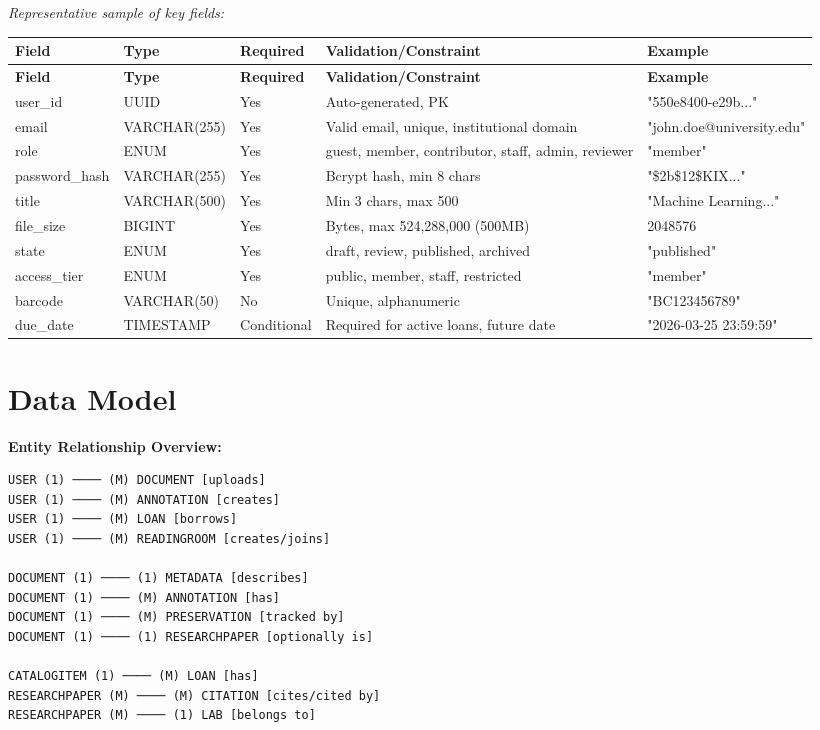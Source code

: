 \documentclass[12pt,a4paper]{report}
\begin{document}
\textit{Representative sample of key fields:}

\begin{longtable}{|p{2.5cm}|p{2cm}|p{1.5cm}|p{4cm}|p{3.5cm}|}
\hline
\textbf{Field} & \textbf{Type} & \textbf{Required} & \textbf{Validation/Constraint} & \textbf{Example} \\ \hline
\endfirsthead
\hline
\textbf{Field} & \textbf{Type} & \textbf{Required} & \textbf{Validation/Constraint} & \textbf{Example} \\ \hline
\endhead
user\_id & UUID & Yes & Auto-generated, PK & "550e8400-e29b..." \\ \hline
email & VARCHAR(255) & Yes & Valid email, unique, institutional domain & "john.doe@university.edu" \\ \hline
role & ENUM & Yes & guest, member, contributor, staff, admin, reviewer & "member" \\ \hline
password\_hash & VARCHAR(255) & Yes & Bcrypt hash, min 8 chars & "\$2b\$12\$KIX..." \\ \hline
title & VARCHAR(500) & Yes & Min 3 chars, max 500 & "Machine Learning..." \\ \hline
file\_size & BIGINT & Yes & Bytes, max 524,288,000 (500MB) & 2048576 \\ \hline
state & ENUM & Yes & draft, review, published, archived & "published" \\ \hline
access\_tier & ENUM & Yes & public, member, staff, restricted & "member" \\ \hline
barcode & VARCHAR(50) & No & Unique, alphanumeric & "BC123456789" \\ \hline
due\_date & TIMESTAMP & Conditional & Required for active loans, future date & "2026-03-25 23:59:59" \\ \hline
\end{longtable}

\section{Data Model}

\textbf{Entity Relationship Overview:}

\begin{verbatim}
USER (1) ──── (M) DOCUMENT [uploads]
USER (1) ──── (M) ANNOTATION [creates]
USER (1) ──── (M) LOAN [borrows]
USER (1) ──── (M) READINGROOM [creates/joins]

DOCUMENT (1) ──── (1) METADATA [describes]
DOCUMENT (1) ──── (M) ANNOTATION [has]
DOCUMENT (1) ──── (M) PRESERVATION [tracked by]
DOCUMENT (1) ──── (1) RESEARCHPAPER [optionally is]

CATALOGITEM (1) ──── (M) LOAN [has]
RESEARCHPAPER (M) ──── (M) CITATION [cites/cited by]
RESEARCHPAPER (M) ──── (1) LAB [belongs to]
\end{verbatim}
\end{document}
